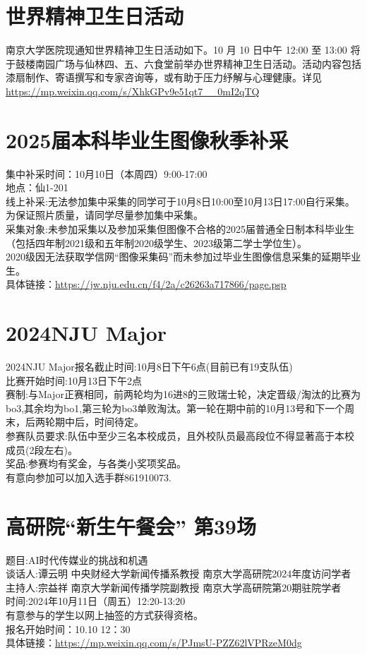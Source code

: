\documentclass[letterpaper, 12pt]{article}
\begin{document}
\begin{multicols}{2}
\section{世界精神卫生日活动}
南京大学医院现通知世界精神卫生日活动如下。10 月 10 日中午 12:00 至 13:00 将于鼓楼南园广场与仙林四、五、六食堂前举办世界精神卫生日活动。\newline 活动内容包括漆扇制作、寄语撰写和专家咨询等，或有助于压力纾解与心理健康。\newline 详见 \url{https://mp.weixin.qq.com/s/XhkGPv9e51qt7__0mI2qTQ}
\section{2025届本科毕业生图像秋季补采}
集中补采时间：10月10日（本周四）9:00-17:00\\ 
地点：仙1-201\\
线上补采:无法参加集中采集的同学可于10月8日10:00至10月13日17:00自行采集。为保证照片质量，请同学尽量参加集中采集。\\
采集对象:未参加采集以及参加采集但图像不合格的2025届普通全日制本科毕业生（包括四年制2021级和五年制2020级学生、2023级第二学士学位生）。\\
2020级因无法获取学信网“图像采集码”而未参加过毕业生图像信息采集的延期毕业生。\\
具体链接：\url{https://jw.nju.edu.cn/f4/2a/c26263a717866/page.psp}\\
\section{2024NJU Major}
2024NJU Major报名截止时间:10月8日下午6点(目前已有19支队伍)
\\比赛开始时间:10月13日下午2点
\\赛制:与Major正赛相同，前两轮均为16进8的三败瑞士轮，决定晋级/淘汰的比赛为bo3,其余均为bo1,第三轮为bo3单败淘汰。第一轮在期中前的10月13号和下一个周末，后两轮期中后，时间待定。
\\参赛队员要求:队伍中至少三名本校成员，且外校队员最高段位不得显著高于本校成员(2段左右)。
\\奖品:参赛均有奖金，与各类小奖项奖品。
\\有意向参加可以加入选手群861910073.


\section{高研院“新生午餐会” 第39场}
题目:AI时代传媒业的挑战和机遇\\
谈话人:谭云明 中央财经大学新闻传播系教授 南京大学高研院2024年度访问学者\\
主持人:宗益祥 南京大学新闻传播学院副教授 南京大学高研院第20期驻院学者\\
时间:2024年10月11日（周五）12:20-13:20\\
有意参与的学生以网上抽签的方式获得资格。\\
报名开始时间：10.10 12：30\\
具体链接：\url{https://mp.weixin.qq.com/s/PJmsU-PZZ62lVPRzeM0dg}


\end{multicols}
\end{document}
